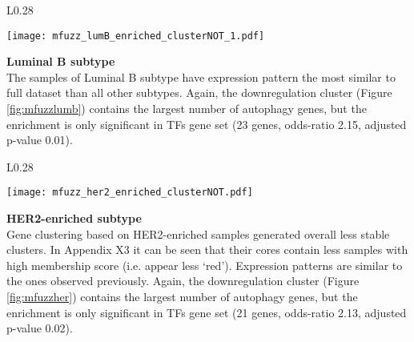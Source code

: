         \begin{wrapfigure}{L}{0.28\textwidth}
        \hfill
        \captionsetup{justification=centering}
        \centerline{ \texttt{[image: mfuzz\_lumB\_enriched\_clusterNOT\_1.pdf]}}
        \vspace*{-8mm}
        \caption[Luminal B subtype downregulation cluster]{\label{fig:mfuzzlumb}Luminal B\newline downregulation cluster}
        \end{wrapfigure}
        
        
        \textbf{Luminal B subtype}\\      
        The samples of Luminal B subtype have expression pattern the most similar to full dataset than all other subtypes. Again, the downregulation cluster (Figure \ref{fig:mfuzzlumb}) contains the largest number of autophagy genes, but the enrichment is only significant in TFs gene set (23 genes, odds-ratio 2.15, adjusted p-value 0.01). 
        \newline
        \newline
        \newline
        \newline
        \newline

      
        \begin{wrapfigure}{L}{0.28\textwidth}
        \hfill
        \captionsetup{justification=centering}
        \centerline{ \texttt{[image: mfuzz\_her2\_enriched\_clusterNOT.pdf]}}
        \vspace*{-8mm}
        \caption[HER2-enriched subtype downregulation cluster]{\label{fig:mfuzzher}HER2-enriched \newline downregulation cluster}
        \end{wrapfigure}
     
     
        \textbf{HER2-enriched subtype}\\   
        Gene clustering based on HER2-enriched samples generated overall less stable clusters. In Appendix X3 it can be seen that their cores contain less samples with high membership score (i.e. appear less ‘red'). Expression patterns are similar to the ones observed previously. Again, the downregulation cluster (Figure \ref{fig:mfuzzher}) contains the largest number of autophagy genes, but the enrichment is only significant in TFs gene set (21 genes, odds-ratio 2.13, adjusted p-value 0.02).
        \newline
        \newline
        \newline        


